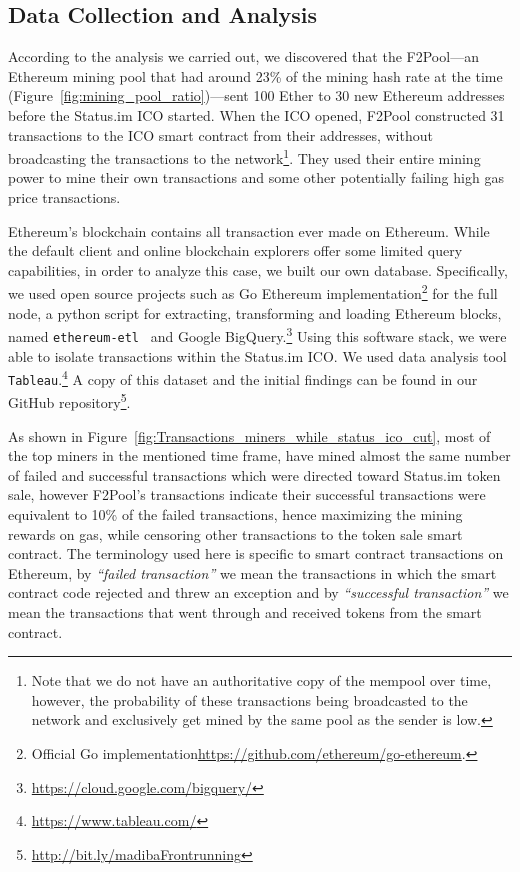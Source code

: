 \subsection{Data Collection and Analysis}
According to the analysis we carried out, we discovered that the F2Pool---an Ethereum mining pool that had around 23\% of the mining hash rate at the time (Figure~\ref{fig:mining_pool_ratio})---sent 100 Ether to 30 new Ethereum addresses before the Status.im ICO started. When the ICO opened, F2Pool constructed 31 transactions to the ICO smart contract from their addresses, without broadcasting the transactions to the network\footnote{Note that we do not have an authoritative copy of the mempool over time, however, the probability of these transactions being broadcasted to the network and exclusively get mined by the same pool as the sender is low.}. They used their entire mining power to mine their own transactions and some other potentially failing high gas price transactions.

Ethereum's blockchain contains all transaction ever made on Ethereum. While the default client and online blockchain explorers offer some limited query capabilities, in order to analyze this case, we built our own database. Specifically, we used open source projects such as Go Ethereum implementation\footnote{Official Go implementation\url{https://github.com/ethereum/go-ethereum}.} for the full node, a python script for extracting, transforming and loading Ethereum blocks, named \texttt{ethereum-etl}~\cite{ethereumetl} and Google BigQuery.\footnote{\url{https://cloud.google.com/bigquery/}} Using this software stack, we were able to isolate transactions within the Status.im ICO. We used data analysis tool \texttt{Tableau}.\footnote{\url{https://www.tableau.com/}} A copy of this dataset and the initial findings can be found in our GitHub repository\footnote{\url{http://bit.ly/madibaFrontrunning}}.

As shown in Figure~\ref{fig:Transactions_miners_while_status_ico_cut}, most of the top miners in the mentioned time frame, have mined almost the same number of failed and successful transactions which were directed toward Status.im token sale, however F2Pool's transactions indicate their successful transactions were equivalent to 10\% of the failed transactions, hence maximizing the mining rewards on gas, while censoring other transactions to the token sale smart contract. The terminology used here is specific to smart contract transactions on Ethereum, by \textit{``failed transaction''} we mean the transactions in which the smart contract code rejected and threw an exception and by \textit{``successful transaction''} we mean the transactions that went through and received tokens from the smart contract.


